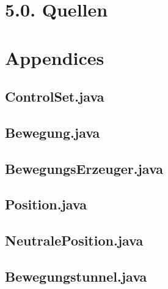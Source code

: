\documentclass[11pt,a4paper,oneside]{article}
\begin{document}
\section{5.0. Quellen}


\section{Appendices}
\subsection*{ControlSet.java}
\subsection*{Bewegung.java}
\subsection*{BewegungsErzeuger.java}
\subsection*{Position.java}
\subsection*{NeutralePosition.java}
\subsection*{Bewegungstunnel.java}
\end{document}
